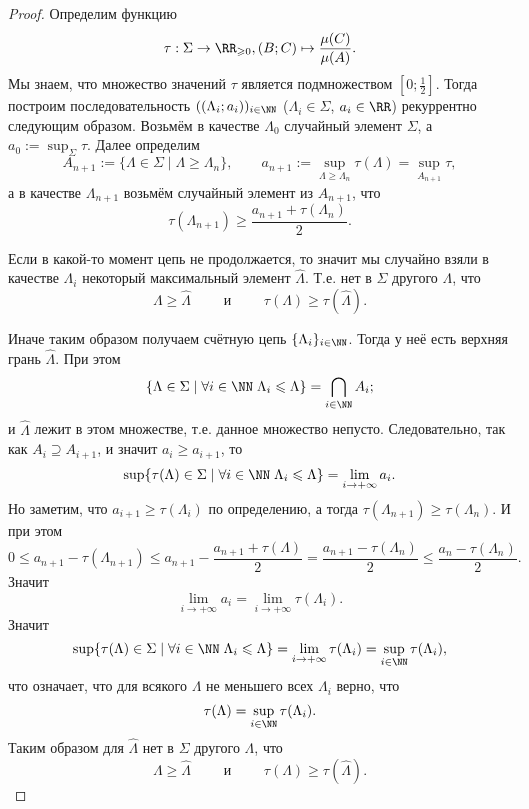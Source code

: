 \documentclass[12pt,a4paper]{article}
\begin{document}
\begin{enumproblem}
\begin{proof}
            Определим функцию
            \[\tau: \Sigma \to \RR_{\geqslant 0}, (B; C) \mapsto \frac{\mu(C)}{\mu(A)}.\]
            Мы знаем, что множество значений $\tau$ является подмножеством $[0; \frac{1}{2}]$. Тогда построим последовательность $((\Lambda_i; a_i))_{i \in \NN}$ ($\Lambda_i \in \Sigma$, $a_i \in \RR$) рекуррентно следующим образом. Возьмём в качестве $\Lambda_0$ случайный элемент $\Sigma$, а $a_0 := \sup_\Sigma \tau$. Далее определим
            \[
                A_{n+1} := \{\Lambda \in \Sigma \mid \Lambda \geqslant \Lambda_n\},
                \qquad
                a_{n+1} := \sup_{\Lambda \geqslant \Lambda_n} \tau(\Lambda) = \sup_{A_{n+1}} \tau,
            \]
            а в качестве $\Lambda_{n+1}$ возьмём случайный элемент из $A_{n+1}$, что
            \[\tau(\Lambda_{n+1}) \geqslant \frac{a_{n+1} + \tau(\Lambda_n)}{2}.\]

            Если в какой-то момент цепь не продолжается, то значит мы случайно взяли в качестве $\Lambda_i$ некоторый максимальный элемент $\widehat{\Lambda}$. Т.е. нет в $\Sigma$ другого $\Lambda$, что
            \[\Lambda \geqslant \widehat{\Lambda} \qquad \text{ и } \qquad \tau(\Lambda) \geqslant \tau(\widehat{\Lambda}).\]

            Иначе таким образом получаем счётную цепь $\{\Lambda_i\}_{i \in \NN}$. Тогда у неё есть верхняя грань $\widehat{\Lambda}$. При этом
            \[\{\Lambda \in \Sigma \mid \forall i \in \NN \; \Lambda_i \leqslant \Lambda\} = \bigcap_{i \in \NN} A_i;\]
            и $\widehat{\Lambda}$ лежит в этом множестве, т.е. данное множество непусто. Следовательно, так как $A_i \supseteq A_{i+1}$, и значит $a_i \geqslant a_{i+1}$, то
            \[\sup \{\tau(\Lambda) \in \Sigma \mid \forall i \in \NN \; \Lambda_i \leqslant \Lambda\} = \lim_{i \to +\infty} a_i.\]
            Но заметим, что $a_{i+1} \geqslant \tau(\Lambda_i)$ по определению, а тогда $\tau(\Lambda_{n+1}) \geqslant \tau(\Lambda_n)$. И при этом
            \[0 \leqslant a_{n+1} - \tau(\Lambda_{n+1}) \leqslant a_{n+1} - \frac{a_{n+1} + \tau(\Lambda)}{2} = \frac{a_{n+1} - \tau(\Lambda_n)}{2} \leqslant \frac{a_n - \tau(\Lambda_n)}{2}.\]
            Значит
            \[\lim_{i \to +\infty} a_i = \lim_{i \to +\infty} \tau(\Lambda_i).\]
            Значит
            \[\sup \{\tau(\Lambda) \in \Sigma \mid \forall i \in \NN \; \Lambda_i \leqslant \Lambda\} = \lim_{i \to +\infty} \tau(\Lambda_i) = \sup_{i \in \NN} \tau(\Lambda_i),\]
            что означает, что для всякого $\Lambda$ не меньшего всех $\Lambda_i$ верно, что
            \[\tau(\Lambda) = \sup_{i \in \NN} \tau(\Lambda_i).\]
            Таким образом для $\widehat{\Lambda}$ нет в $\Sigma$ другого $\Lambda$, что
            \[\Lambda \geqslant \widehat{\Lambda} \qquad \text{ и } \qquad \tau(\Lambda) \geqslant \tau(\widehat{\Lambda}).\]


\end{proof}
\end{enumproblem}
\end{document}
